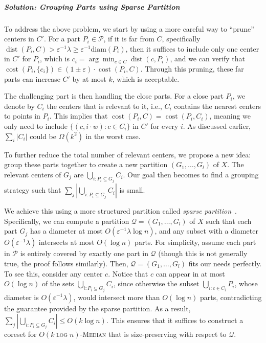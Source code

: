 \documentclass[letterpaper,11pt]{article}
\theoremstyle{plain}
\theoremstyle{definition}
\theoremstyle{remark}
\DeclareMathOperator{\cost}{cost}
\DeclareMathOperator{\dist}{dist}
\newcommand{\diam}{\mathrm{diam}}
\newcommand{\eps}{\varepsilon}
\newcommand{\calP}{\mathcal{P}}
\newcommand{\calQ}{\mathcal{Q}}
\newcommand{\ProblemName}[1]{\textsc{#1}}
\begin{document}
\subparagraph{Solution: Grouping Parts using Sparse Partition~\cite{Jia05Universal}} 

To address the above problem, we start by using a more careful way to ``prune'' centers in $C'$.
For a part $P_i \in \calP$, if it is far from $C$, specifically $\dist(P_i, C) > \eps^{-1}\lambda \ge \eps^{-1}\diam(P_i)$, then it suffices to include only one center in $C'$ for $P_i$, which is $c_i = \arg\min_{c \in C} \dist(c, P_i)$, and we can verify that $\cost(P_i, \{c_i\}) \in (1 \pm \eps) \cdot \cost(P_i, C)$. Through this pruning, these far parts can increase $C'$ by at most $k$, which is acceptable.

The challenging part is then handling the close parts. For a close part $P_i$, we denote by $C_i$ the centers that is relevant to it, i.e., $C_i$ contains the nearest centers to points in $P_i$. This implies that $\cost(P_i,C) = \cost(P_i,C_i)$, meaning we only need to include $\{(c,i\cdot w) : c \in C_i\}$ in $C'$ for every $i$.
As discussed earlier, $\sum_i |C_i|$ could be $\Omega(k^2)$ in the worst case.


To further reduce the total number of relevant centers, we propose a new idea: group these parts together to create a new partition $(G_1, \dots, G_l)$ of $X$. The relevant centers of $G_j$ are $\bigcup_{i: P_i \subseteq G_j} C_i$. Our goal then becomes to find a grouping strategy such that $\sum_j |\bigcup_{i: P_i \subseteq G_j} C_i|$ is small.

We achieve this using a more structured partition called \emph{sparse partition}~\cite{Jia05Universal}. Specifically, we can compute a partition $\calQ = (G_1, \dots, G_l)$ of $X$ such that each part $G_j$ has a diameter at most $O(\eps^{-1}\lambda \log n)$, and any subset with a diameter $O(\eps^{-1}\lambda)$ intersects at most $O(\log n)$ parts. For simplicity, assume each part in $\calP$ is entirely covered by exactly one part in $\calQ$ (though this is not generally true, the proof follows similarly). 
Then, $\calQ=(G_1,\dots,G_l)$ fits our needs perfectly. To see this, consider any center $c$. Notice that $c$ can appear in at most $O(\log n)$ of the sets $\bigcup_{i: P_i \subseteq G_j} C_i$, since otherwise the subset $\bigcup_{i: c \in C_i} P_i$, whose diameter is $O(\eps^{-1}\lambda)$, would intersect more than $O(\log n)$ parts, contradicting the guarantee provided by the sparse partition.
As a result, $\sum_j |\bigcup_{i: P_i \subseteq G_j} C_i| \le O(k \log n)$. This ensures that it suffices to construct a coreset for \ProblemName{$O(k \log n)$-Median}\xspace that is size-preserving with respect to $\calQ$.
\end{document}
